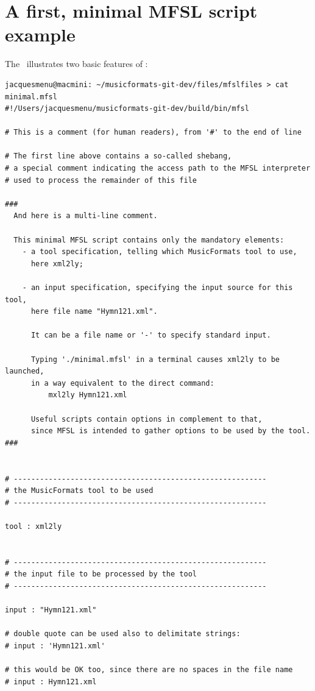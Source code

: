 \section{A first, minimal MFSL script example}

The  \script\ illustrates two basic features of \mfslLang:
\begin{lstlisting}[language=MFSL]
jacquesmenu@macmini: ~/musicformats-git-dev/files/mfslfiles > cat minimal.mfsl
#!/Users/jacquesmenu/musicformats-git-dev/build/bin/mfsl

# This is a comment (for human readers), from '#' to the end of line

# The first line above contains a so-called shebang,
# a special comment indicating the access path to the MFSL interpreter
# used to process the remainder of this file

###
  And here is a multi-line comment.

  This minimal MFSL script contains only the mandatory elements:
    - a tool specification, telling which MusicFormats tool to use,
      here xml2ly;

    - an input specification, specifying the input source for this tool,
      here file name "Hymn121.xml".

      It can be a file name or '-' to specify standard input.

      Typing './minimal.mfsl' in a terminal causes xml2ly to be launched,
      in a way equivalent to the direct command:
          mxl2ly Hymn121.xml

      Useful scripts contain options in complement to that,
      since MFSL is intended to gather options to be used by the tool.
###


# ----------------------------------------------------------
# the MusicFormats tool to be used
# ----------------------------------------------------------

tool : xml2ly


# ----------------------------------------------------------
# the input file to be processed by the tool
# ----------------------------------------------------------

input : "Hymn121.xml"

# double quote can be used also to delimitate strings:
# input : 'Hymn121.xml'

# this would be OK too, since there are no spaces in the file name
# input : Hymn121.xml
\end{lstlisting}


